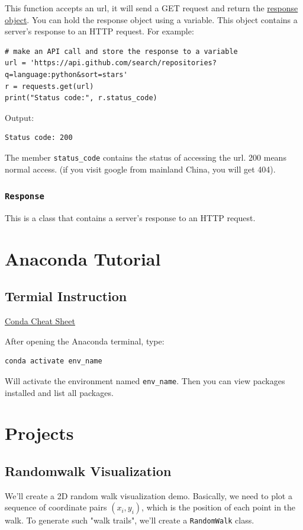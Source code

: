 \documentclass[12pt]{book}
\begin{document}
This function accepts an url, it will send a GET request and return the \href{https://2.python-requests.org/en/master/api/\#requests.Response}{response object}. You can hold the response object using a variable. This object contains a server's response to an HTTP request. For example:
\begin{verbatim}
# make an API call and store the response to a variable
url = 'https://api.github.com/search/repositories?q=language:python&sort=stars'
r = requests.get(url)
print("Status code:", r.status_code)
\end{verbatim}
Output:
\begin{verbatim}
Status code: 200
\end{verbatim}
The member \texttt{status\_code} contains the status of accessing the url. 200 means normal access. (if you visit google from mainland China, you will get 404).

\section{\texttt{Response}}
\label{sec:org36d4106}
This is a class that contains a server's response to an HTTP request.
\part{Anaconda Tutorial}
\label{sec:org8cc29e4}
\chapter{Termial Instruction}
\label{sec:orgcdb9ee7}
\href{https://docs.conda.io/projects/conda/en/4.6.0/\_downloads/52a95608c49671267e40c689e0bc00ca/conda-cheatsheet.pdf}{Conda Cheat Sheet}

After opening the Anaconda terminal, type:
\begin{verbatim}
conda activate env_name
\end{verbatim}
Will activate the environment named \texttt{env\_name}. Then you can view packages installed and list all packages.

\part{Projects}
\label{sec:org85fd4ca}
\chapter{Randomwalk Visualization}
\label{sec:org0ecfa99}
We'll create a 2D random walk visualization demo. Basically, we need to plot a sequence of coordinate pairs \((x_i, y_i)\), which is the position of each point in the walk. To generate such "walk trails", we'll create a \texttt{RandomWalk} class.
\end{document}
